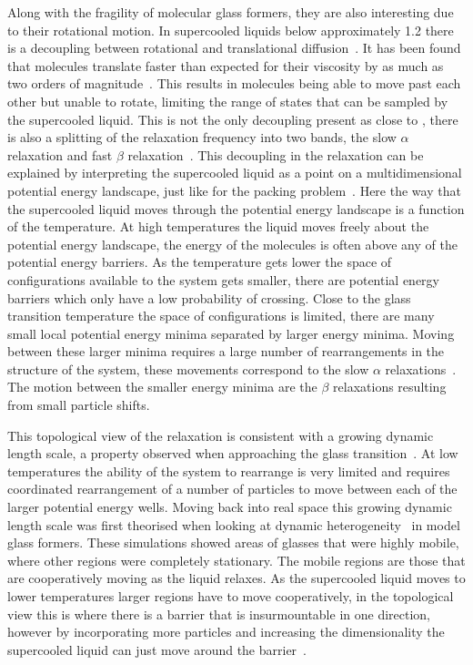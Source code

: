 Along with the fragility of molecular glass formers, they are also interesting due to their rotational motion. In supercooled liquids below approximately \SI{1.2}{\Tg} there is a decoupling between rotational and translational diffusion~\tocite. It has been found that molecules translate faster than expected for their viscosity by as much as two orders of magnitude~\cite{debenedetti:01}. This results in molecules being able to move past each other but unable to rotate, limiting the range of states that can be sampled by the supercooled liquid. This is not the only decoupling present as close to \si{\Tg}, there is also a splitting of the relaxation frequency into two bands, the slow $\alpha$ relaxation and fast $\beta$ relaxation~\tocite. This decoupling in the relaxation can be explained by interpreting the supercooled liquid as a point on a multidimensional potential energy landscape, just like for the packing problem~\secref{}. Here the way that the supercooled liquid moves through the potential energy landscape is a function of the temperature. At high temperatures the liquid moves freely about the potential energy landscape, the energy of the molecules is often above any of the potential energy barriers. As the temperature gets lower the space of configurations available to the system gets smaller, there are potential energy barriers which only have a low probability of crossing. Close to the glass transition temperature the space of configurations is limited, there are many small local potential energy minima separated by larger energy minima. Moving between these larger minima requires a large number of rearrangements in the structure of the system, these movements correspond to the slow $\alpha$ relaxations~. The motion between the smaller energy minima are the $\beta$ relaxations resulting from small particle shifts.

\begin{figure}
    \centering
    \caption{}
    \label{fig:pe landscape}
\end{figure}

This topological view of the relaxation is consistent with a growing dynamic length scale, a property observed when approaching the glass transition~\cite{berthier:05}. At low temperatures the ability of the system to rearrange is very limited and requires coordinated rearrangement of a number of particles to move between each of the larger potential energy wells. Moving back into real space this growing dynamic length scale was first theorised when looking at dynamic heterogeneity~\cite{hurley:95} in model glass formers. These simulations showed areas of glasses that were highly mobile, where other regions were completely stationary. The mobile regions are those that are cooperatively moving as the liquid relaxes. As the supercooled liquid moves to lower temperatures larger regions have to move cooperatively, in the topological view this is where there is a barrier that is insurmountable in one direction, however by incorporating more particles and increasing the dimensionality the supercooled liquid can just move around the barrier~.

